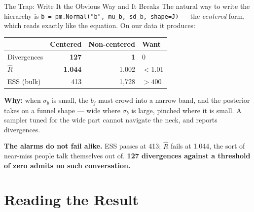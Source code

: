 \documentclass[aspectratio=169, 11pt]{beamer}
\begin{document}
\begin{frame}{The Trap: Write It the Obvious Way and It Breaks}
  The natural way to write the hierarchy is \texttt{b = pm.Normal("b", mu\_b, sd\_b, shape=J)}
  --- the \emph{centered} form, which reads exactly like the equation. On our data it produces:
  \begin{center}
    {\small
    \begin{tabular}{lrrl}
      \toprule
      & \textbf{Centered} & \textbf{Non-centered} & \textbf{Want} \\
      \midrule
      Divergences & \textbf{127} & \textbf{1} & 0 \\
      $\hat{R}$ & \textbf{1.044} & 1.002 & $< 1.01$ \\
      ESS (bulk) & 413 & 1{,}728 & $> 400$ \\
      \bottomrule
    \end{tabular}
    }
  \end{center}

  \vspace{-0.05cm}
  \textbf{Why:} when $\sigma_b$ is small, the $b_j$ must crowd into a narrow band, and the
  posterior takes on a funnel shape --- wide where $\sigma_b$ is large, pinched where it is
  small. A sampler tuned for the wide part cannot navigate the neck, and reports divergences.

  \vspace{0.05cm}
  \textbf{The alarms do not fail alike.} ESS passes at 413; $\hat{R}$ fails at 1.044, the sort of
  near-miss people talk themselves out of. \textbf{127 divergences against a threshold of zero
  admits no such conversation.}

  \vspace{0.02cm}
\end{frame}

\section{Reading the Result}

\end{document}
